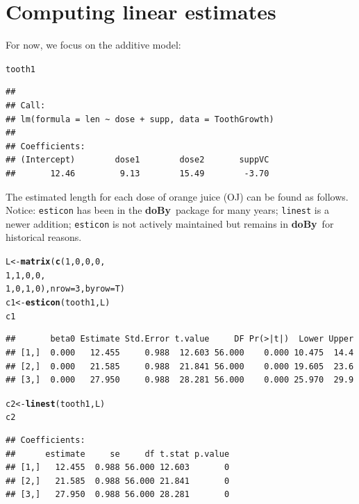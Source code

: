\documentclass[10pt]{article}\usepackage[]{graphicx}\usepackage[]{color}
\makeatletter
\newcommand{\hlnum}[1]{\textcolor[rgb]{0.686,0.059,0.569}{#1}}%
\newcommand{\hlstd}[1]{\textcolor[rgb]{0.345,0.345,0.345}{#1}}%
\newcommand{\hlkwb}[1]{\textcolor[rgb]{0.69,0.353,0.396}{#1}}%
\newcommand{\hlkwc}[1]{\textcolor[rgb]{0.333,0.667,0.333}{#1}}%
\newcommand{\hlkwd}[1]{\textcolor[rgb]{0.737,0.353,0.396}{\textbf{#1}}}%
\newenvironment{kframe}{%
 \def\at@end@of@kframe{}%
 \ifinner\ifhmode%
  \def\at@end@of@kframe{\end{minipage}}%
  \begin{minipage}{\columnwidth}%
 \fi\fi%
 \def\FrameCommand##1{\hskip\@totalleftmargin \hskip-\fboxsep
 \colorbox{shadecolor}{##1}\hskip-\fboxsep
     \hskip-\linewidth \hskip-\@totalleftmargin \hskip\columnwidth}%
 \MakeFramed {\advance\hsize-\width
   \@totalleftmargin\z@ \linewidth\hsize
   \@setminipage}}%
 {\par\unskip\endMakeFramed%
 \at@end@of@kframe}
\newenvironment{knitrout}{}{} %
\def\pkg#1{{\bf #1}}
\def\doby{\pkg{doBy}}
\makeatother
\begin{document}
\section{Computing linear estimates}
\label{sec:comp-line-estim}


For now, we focus on the additive model:
\begin{knitrout}
\color{fgcolor}\begin{kframe}
\begin{alltt}
\hlstd{tooth1}
\end{alltt}
\begin{verbatim}
## 
## Call:
## lm(formula = len ~ dose + supp, data = ToothGrowth)
## 
## Coefficients:
## (Intercept)        dose1        dose2       suppVC  
##       12.46         9.13        15.49        -3.70
\end{verbatim}
\end{kframe}
\end{knitrout}

The estimated length for each dose of orange juice (OJ) can be found
as follows. Notice: \verb|esticon| has been in the \doby\ package for
many years; \verb|linest| is a newer addition; \verb|esticon| is not
actively maintained but remains in \doby\ for historical reasons.



\begin{knitrout}
\color{fgcolor}\begin{kframe}
\begin{alltt}
\hlstd{L} \hlkwb{<-} \hlkwd{matrix}\hlstd{(}\hlkwd{c}\hlstd{(}\hlnum{1}\hlstd{,} \hlnum{0}\hlstd{,} \hlnum{0}\hlstd{,} \hlnum{0}\hlstd{,}
              \hlnum{1}\hlstd{,} \hlnum{1}\hlstd{,} \hlnum{0}\hlstd{,} \hlnum{0}\hlstd{,}
              \hlnum{1}\hlstd{,} \hlnum{0}\hlstd{,} \hlnum{1}\hlstd{,} \hlnum{0}\hlstd{),} \hlkwc{nrow}\hlstd{=}\hlnum{3}\hlstd{,} \hlkwc{byrow}\hlstd{=T)}
\hlstd{c1} \hlkwb{<-} \hlkwd{esticon}\hlstd{(tooth1, L)}
\hlstd{c1}
\end{alltt}
\begin{verbatim}
##       beta0 Estimate Std.Error t.value     DF Pr(>|t|)  Lower Upper
## [1,]  0.000   12.455     0.988  12.603 56.000    0.000 10.475  14.4
## [2,]  0.000   21.585     0.988  21.841 56.000    0.000 19.605  23.6
## [3,]  0.000   27.950     0.988  28.281 56.000    0.000 25.970  29.9
\end{verbatim}
\begin{alltt}
\hlstd{c2} \hlkwb{<-} \hlkwd{linest}\hlstd{(tooth1, L)}
\hlstd{c2}
\end{alltt}
\begin{verbatim}
## Coefficients:
##      estimate     se     df t.stat p.value
## [1,]   12.455  0.988 56.000 12.603       0
## [2,]   21.585  0.988 56.000 21.841       0
## [3,]   27.950  0.988 56.000 28.281       0
\end{verbatim}
\end{kframe}
\end{knitrout}
\end{document}
